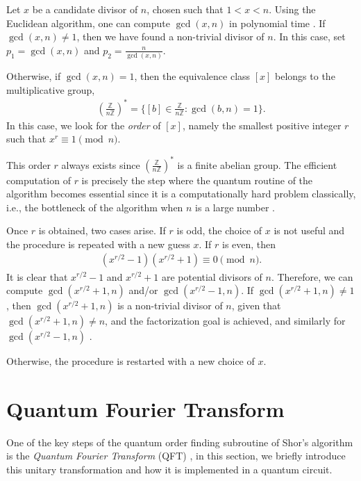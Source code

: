 \documentclass[aps,prl,twocolumn,superscriptaddress,groupedaddress]{revtex4}  %
\begin{document}
Let $x$ be a candidate divisor of $n$, chosen such that $1 < x < n$. Using the Euclidean algorithm, one can compute $\gcd(x, n)$ in polynomial time \cite{Shallit94}. If $\gcd(x, n) \neq 1$, then we have found a non-trivial divisor of $n$. In this case, set $p_1 = \gcd(x, n)$ and $p_2 = \frac{n}{\gcd(x, n)}$.

Otherwise, if $\gcd(x, n) = 1$, then the equivalence class $[x]$ belongs to the multiplicative group,
\begin{align*}
    \left(\tfrac{\mathbb{Z}}{n\mathbb{Z}}\right)^* 
    = \{ [b] \in \tfrac{\mathbb{Z}}{n\mathbb{Z}} : \gcd(b,n)=1 \}.
\end{align*}
In this case, we look for the \emph{order} of $[x]$, namely the smallest positive integer $r$  such that $x^r \equiv 1 \pmod{n}$.

This order $r$ always exists since $\left(\tfrac{\mathbb{Z}}{n\mathbb{Z}}\right)^*$ is a finite abelian group. The efficient computation of $r$ is precisely the step where the quantum routine of the algorithm becomes essential since it is a computationally hard problem classically, i.e., the bottleneck of the algorithm when $n$ is a large number \cite{bach1996ant}.

Once $r$ is obtained, two cases arise. If $r$ is odd, the choice of $x$ is not useful and the procedure is repeated with a new guess $x$. If $r$ is even, then 
\begin{align*}
       (x^{r/2} - 1)(x^{r/2} + 1) \equiv 0 \pmod{n}.
	\end{align*}
	It is clear that $x^{r/2} - 1$ and $x^{r/2} + 1$ are potential divisors of $n$. Therefore, we can compute $\gcd(x^{r/2} + 1, n)$ and/or $\gcd(x^{r/2} - 1, n)$.
    If $\gcd(x^{r/2} + 1, n) \neq 1$, then $\gcd(x^{r/2} + 1, n)$ is a non-trivial divisor of $n$, given that $\gcd(x^{r/2} + 1, n)\neq n$, and the factorization goal is achieved, and similarly for $\gcd(x^{r/2} - 1, n)$ .

    Otherwise, the procedure is restarted with a new choice of $x$.
\section{\label{sec:QFT}Quantum Fourier Transform}
 One of the key steps of the quantum order finding subroutine of Shor's algorithm is the \textit{Quantum Fourier Transform} (QFT) \cite{Nielsen_Chuang_2010, coppersmith2002approximate}, in this section, we briefly introduce this unitary transformation and how it is implemented in a quantum circuit.
\end{document}
